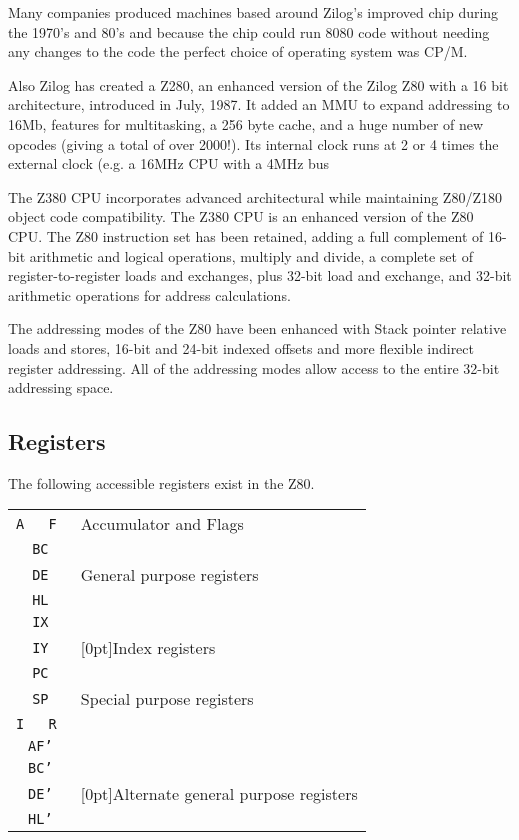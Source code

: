 \documentclass[12pt,twoside,openright,a4paper]{book}
\begin{document}
Many companies produced machines based around Zilog's improved chip during the 1970's and 80's and because the chip could run 8080 code without needing any changes to the code the perfect choice of operating system was CP/M. 

Also Zilog has created a Z280, an enhanced version of the Zilog Z80 with a 16 bit architecture, introduced in July, 1987. It added an MMU to expand addressing to 16Mb, features for multitasking, a 256 byte cache, and a huge number of new opcodes (giving a total of over 2000!). Its internal clock runs at 2 or 4 times the external clock (e.g. a 16MHz CPU with a 4MHz bus

The Z380 CPU incorporates advanced architectural while maintaining Z80/Z180 object code compatibility. The Z380 CPU is an enhanced version of the Z80 CPU. The Z80 instruction set has been retained, adding a full complement of 16-bit arithmetic and logical operations, multiply and divide, a complete set of register-to-register loads and exchanges, plus 32-bit load and exchange, and 32-bit arithmetic operations for address calculations.

The addressing modes of the Z80 have been enhanced with Stack pointer relative loads and stores, 16-bit and 24-bit indexed offsets and more flexible indirect register addressing. All of the addressing modes allow access to the entire 32-bit addressing space.


\subsection{Registers}

The following accessible registers exist in the Z80.

\begin{tabular}{|c|c|l}
	\cline{1-2}
	\tt A & \tt F & Accumulator and Flags \\ \cline{1-2} \cline{1-2}
	\multicolumn{2}{|c|}{\tt BC} & \\ \cline{1-2}
	\multicolumn{2}{|c|}{\tt DE} & General purpose registers \\ \cline{1-2}
	\multicolumn{2}{|c|}{\tt HL} & \\ \cline{1-2}
	\multicolumn{2}{|c|}{\tt IX} & \\ \cline{1-2}
	\multicolumn{2}{|c|}{\tt IY} & \raisebox{1.5ex}[0pt]{Index registers} \\ \cline{1-2}
	\multicolumn{2}{|c|}{\tt PC} & \\ \cline{1-2}
	\multicolumn{2}{|c|}{\tt SP} & Special purpose registers \\ \cline{1-2}
	\tt I & \tt R & \\ \cline{1-2}
	\multicolumn{2}{|c|}{\tt AF'} & \\ \cline{1-2}
	\multicolumn{2}{|c|}{\tt BC'} & \\ \cline{1-2}
	\multicolumn{2}{|c|}{\tt DE'} & \raisebox{1.5ex}[0pt]{Alternate general purpose registers}\\ \cline{1-2}
	\multicolumn{2}{|c|}{\tt HL'} & \\ \cline{1-2}
\end{tabular}
\end{document}
